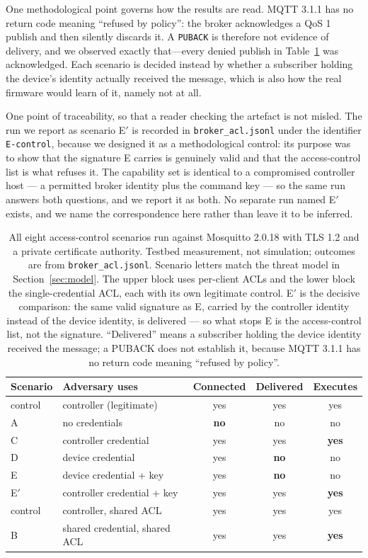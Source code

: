One methodological point governs how the results are read. MQTT 3.1.1 has no return code
meaning ``refused by policy'': the broker acknowledges a QoS 1 publish and then silently
discards it. A \texttt{PUBACK} is therefore not evidence of delivery, and we observed exactly
that---every denied publish in Table~\ref{tab:broker} was acknowledged. Each scenario is
decided instead by whether a subscriber holding the device's identity actually received the
message, which is also how the real firmware would learn of it, namely not at all.

One point of traceability, so that a reader checking the artefact is not misled. The run we report
as scenario E$'$ is recorded in \texttt{broker\_acl.jsonl} under the identifier
\texttt{E-control}, because we designed it as a methodological control: its purpose was to show
that the signature E carries is genuinely valid and that the access-control list is what refuses
it. The capability set is identical to a compromised controller host --- a permitted broker
identity plus the command key --- so the same run answers both questions, and we report it as
both. No separate run named E$'$ exists, and we name the correspondence here rather than leave it
to be inferred.

\begin{table}[htbp]
\centering\small
\caption{All eight access-control scenarios run against Mosquitto 2.0.18 with TLS 1.2 and a
private certificate authority. Testbed measurement, not simulation; outcomes are from
\texttt{broker\_acl.jsonl}. Scenario letters match the threat model in
Section~\ref{sec:model}. The upper block uses per-client ACLs and the lower block the
single-credential ACL, each with its own legitimate control. E$'$ is the decisive comparison:
the same valid signature as E, carried by the controller identity instead of the device
identity, is delivered --- so what stops E is the access-control list, not the signature.
``Delivered'' means a subscriber holding the device identity received the message; a PUBACK
does not establish it, because MQTT 3.1.1 has no return code meaning ``refused by policy''.}
\label{tab:broker}
\begin{tabular}{@{}llccc@{}}
\toprule
Scenario & Adversary uses & Connected & Delivered & Executes \\
\midrule
control & controller (legitimate) & yes & yes & yes \\
A & no credentials          & \textbf{no} & no  & no \\
C & controller credential   & yes & yes & \textbf{yes} \\
D & device credential       & yes & \textbf{no}  & no \\
E & device credential + key & yes & \textbf{no}  & no \\
E$'$ & controller credential + key & yes & yes & \textbf{yes} \\
\midrule
control & controller, shared ACL & yes & yes & yes \\
B & shared credential, shared ACL & yes & yes & \textbf{yes} \\
\bottomrule
\end{tabular}
\end{table}

